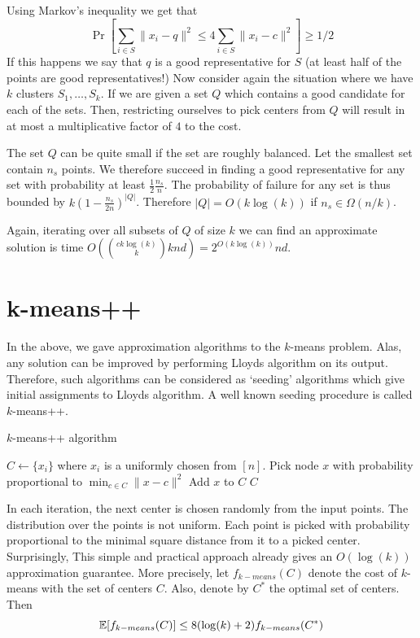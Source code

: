 \documentclass{article}
\begin{document}
\noindent Using Markov's inequality we get that
\[
\Pr[\sum_{i \in S} \|x_i - q\|^2 \le 4\sum_{i \in S}  \|x_i - c\|^2] \ge 1/2
\]
If this happens we say that $q$ is a good representative for $S$ (at least half of the points are good representatives!) 
Now consider again the situation where we have $k$ clusters $S_1,\dots,S_k$.
If we are given a set $Q$ which contains a good candidate for each of the sets.
Then, restricting ourselves to pick centers from $Q$ will result in at most a multiplicative factor of $4$ to the cost.

The set $Q$ can be quite small if the set are roughly balanced.
Let the smallest set contain $n_s$ points. 
We therefore succeed in finding a good representative for any set with probability at least $\frac{1}{2}\frac{n_s}{n}$.
The probability of failure for any set is thus bounded by $k (1 - \frac{n_s}{2n})^{|Q|}$.
Therefore $|Q| = O(k \log(k))$ if $n_s \in \Omega(n/k)$.

Again, iterating over all subsets of $Q$ of size $k$ we can find an approximate 
solution is time $O({ck \log(k) \choose k}knd) = 2^{O(k \log(k))}nd$.

\section{k-means++}

In the above, we gave approximation algorithms to the $k$-means problem.
Alas, any solution can be improved by performing Lloyds algorithm on its output.
Therefore, such algorithms can be considered as `seeding' algorithms 
which give initial assignments to Lloyds algorithm.
A well known seeding procedure \cite{ArthurV07} is called $k$-means++.
\begin{algorithm}
\caption{$k$-means++ algorithm  \cite{ArthurV07}}
\begin{algorithmic}
\STATE $C \leftarrow \{x_i\}$ where $x_i$ is a uniformly chosen from $[n]$.
	\STATE Pick node $x$ with probability proportional to $\min_{c \in C} \|x - c\|^2$
	\STATE Add $x$ to $C$
\ENDFOR
{} $C$
\end{algorithmic}
\end{algorithm}
In each iteration, the next center is chosen randomly from the input points.
The distribution over the points is not uniform. 
Each point is picked with probability proportional to the minimal square distance from it to a picked center.
Surprisingly, This simple and practical approach already gives an $O(\log(k))$ approximation guarantee.
More precisely, let $f_{k-means}(C)$ denote the cost of $k$-means with the set of centers $C$.
Also, denote by $C^*$ the optimal set of centers. Then 
\[
{\mathbb E}[f_{k-means}(C)] \le 8 (\log(k)+2)f_{k-means}(C^*)
\]
\end{document}

